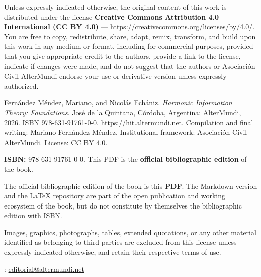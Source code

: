 \vspace{0.22em}
{\par}
Unless expressly indicated otherwise, the original content of this work is distributed under the license \textbf{Creative Commons Attribution 4.0 International (CC BY 4.0)} --- \url{https://creativecommons.org/licenses/by/4.0/}. You are free to copy, redistribute, share, adapt, remix, transform, and build upon this work in any medium or format, including for commercial purposes, provided that you give appropriate credit to the authors, provide a link to the license, indicate if changes were made, and do not suggest that the authors or Asociaci\'on Civil AlterMundi endorse your use or derivative version unless expressly authorized.

\vspace{0.22em}
{\par}
Fern\'andez M\'endez, Mariano, and Nicol\'as Ech\'aniz. \emph{Harmonic Information Theory: Foundations}. Jos\'e de la Quintana, C\'ordoba, Argentina: AlterMundi, 2026. ISBN 978-631-91761-0-0. \url{https://hit.altermundi.net}. Compilation and final writing: Mariano Fern\'andez M\'endez. Institutional framework: Asociaci\'on Civil AlterMundi. License: CC BY 4.0.

\vspace{0.22em}
{\par}
\textbf{ISBN:} 978-631-91761-0-0. This PDF is the \textbf{official bibliographic edition} of the book.

\vspace{0.22em}
{\par}
The official bibliographic edition of the book is this \textbf{PDF}. The Markdown version and the LaTeX repository are part of the open publication and working ecosystem of the book, but do not constitute by themselves the bibliographic edition with ISBN.

\clearpage
\thispagestyle{empty}
\vspace*{0.025\textheight}
{\par}
Images, graphics, photographs, tables, extended quotations, or any other material identified as belonging to third parties are excluded from this license unless expressly indicated otherwise, and retain their respective terms of use.

\vspace{0.22em}
{: \href{mailto:editorial@altermundi.net}{editorial@altermundi.net}\par}

